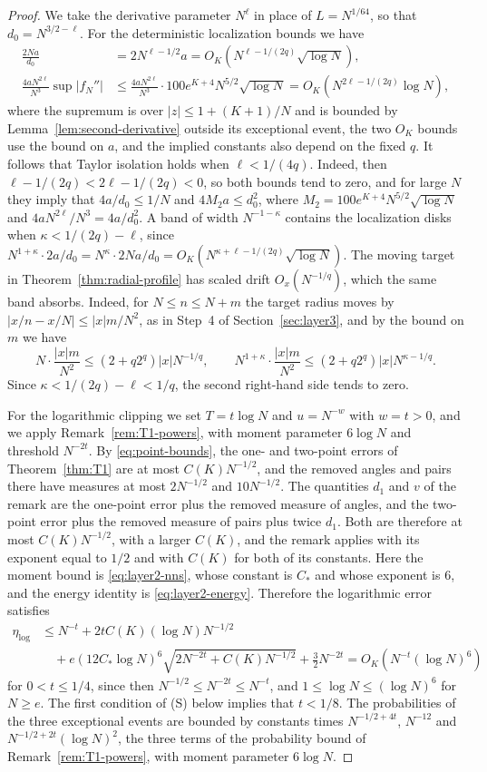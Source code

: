 \begin{proof}
We take the derivative parameter $N^\ell$ in place of $L=N^{1/64}$, so
that $d_0=N^{3/2-\ell}$.
For the deterministic localization bounds we have
\begin{align*}
 \frac{2Na}{d_0}&=2N^{\ell-1/2}a=O_K(N^{\ell-1/(2q)}\sqrt{\log N}),\\
 \frac{4aN^{2\ell}}{N^3}\sup|f_N''|
    &\le\frac{4aN^{2\ell}}{N^3}\cdot100e^{K+4}N^{5/2}\sqrt{\log N}
    =O_K(N^{2\ell-1/(2q)}\log N),
\end{align*}
where the supremum is over $|z|\le1+(K+1)/N$ and is bounded by
Lemma~\ref{lem:second-derivative} outside its exceptional event, the two
$O_K$ bounds use the bound on $a$, and the implied constants also depend
on the fixed $q$.
It follows that Taylor isolation holds when $\ell<1/(4q)$. Indeed, then
$\ell-1/(2q)<2\ell-1/(2q)<0$, so both bounds tend to zero,
and for large $N$ they imply that $4a/d_0\le1/N$ and $4M_2a\le d_0^2$, where
$M_2=100e^{K+4}N^{5/2}\sqrt{\log N}$ and $4aN^{2\ell}/N^3=4a/d_0^2$.
A band of width $N^{-1-\kappa}$ contains the localization disks when
$\kappa<1/(2q)-\ell$, since
$N^{1+\kappa}\cdot2a/d_0=N^\kappa\cdot2Na/d_0
=O_K(N^{\kappa+\ell-1/(2q)}\sqrt{\log N})$.
The moving target in Theorem~\ref{thm:radial-profile} has scaled drift
$O_x(N^{-1/q})$, which the same band absorbs.
Indeed, for $N\le n\le N+m$ the target radius moves by
$|x/n-x/N|\le|x|m/N^2$, as in Step~4 of Section~\ref{sec:layer3}, and by the
bound on $m$ we have
\[
 N\cdot\frac{|x|m}{N^2}\le(2+q2^q)|x|N^{-1/q},\qquad
 N^{1+\kappa}\cdot\frac{|x|m}{N^2}\le(2+q2^q)|x|N^{\kappa-1/q}.
\]
Since $\kappa<1/(2q)-\ell<1/q$, the second right-hand side tends to
zero.

For the logarithmic clipping we set $T=t\log N$ and $u=N^{-w}$ with
$w=t>0$, and we apply Remark~\ref{rem:T1-powers}, with moment parameter
$6\log N$ and threshold $N^{-2t}$.
By \eqref{eq:point-bounds}, the one- and
two-point errors of Theorem~\ref{thm:T1} are at most $C(K)N^{-1/2}$, and
the removed angles and pairs there have measures at most $2N^{-1/2}$ and
$10N^{-1/2}$. The quantities $d_1$ and $v$ of the remark are the
one-point error plus the removed measure of angles, and the two-point
error plus the removed measure of pairs plus twice $d_1$. Both are
therefore at most $C(K)N^{-1/2}$, with a larger $C(K)$, and the remark
applies with its exponent equal to $1/2$ and with $C(K)$ for both of its
constants. Here the moment bound is \eqref{eq:layer2-nns}, whose constant
is $C_*$ and whose exponent is $6$, and the energy identity is
\eqref{eq:layer2-energy}. Therefore the logarithmic error satisfies
\begin{align*}
 \eta_{\log}
 &\le N^{-t}+2tC(K)(\log N)N^{-1/2}\\
 &\quad+e(12C_*\log N)^6\sqrt{2N^{-2t}+C(K)N^{-1/2}}+\tfrac32N^{-2t}
 =O_K(N^{-t}(\log N)^6)
\end{align*}
for $0<t\le1/4$, since then $N^{-1/2}\le N^{-2t}\le N^{-t}$, and
$1\le\log N\le(\log N)^6$ for $N\ge e$. The first condition of (S) below
implies that $t<1/8$.
The probabilities of the three exceptional events are bounded by
constants times $N^{-1/2+4t}$, $N^{-12}$ and $N^{-1/2+2t}(\log N)^2$, the
three terms of the probability bound of Remark~\ref{rem:T1-powers},
with moment parameter $6\log N$.


\end{proof}
